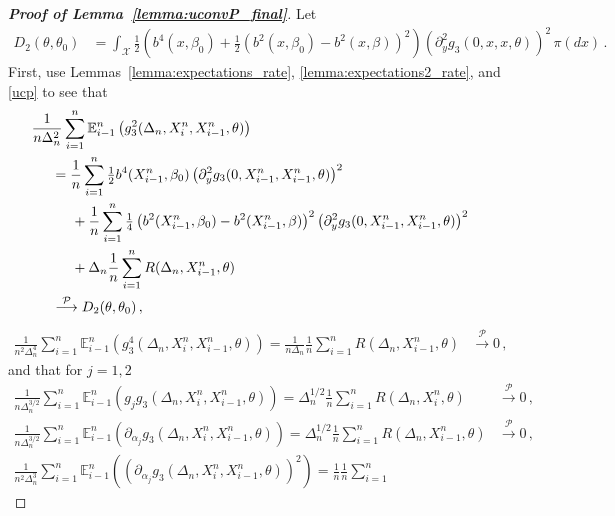 \documentclass[11pt,a4paper]{article}
\newcommand{\xtl}{{X^n_{i-1}}}
\newcommand{\xtr}{X^n_i}
\newcommand{\thetan}{{\theta_0}}
\newcommand{\betan}{{\beta_0}}
\newcommand{\EE}{{\mathbb E}}
\newcommand{\pp}{{\mathcal{P}}}
\newcommand{\xx}{{\mathcal{X}}}
\numberwithin{equation}{section}
\numberwithin{theorem}{section}
\begin{document}
\begin{proof}[\textbf{Proof of Lemma~\ref{lemma:uconvP_final}}]
Let 
\begin{align*}
D_2(\theta, \thetan) &= \int_\xx \tfrac{1}{2}\left( b^4(x, \betan) + \tfrac{1}{2}\left( b^2(x, \betan) - b^2(x,\beta)\right)^2\right)\left(\partial^2_y g_3(0,x,x,\theta)\right)^2\, \pi(dx)\,.
\end{align*}
%
First, use Lemmas~\ref{lemma:expectations_rate}, \ref{lemma:expectations2_rate}, and \ref{ucp} to see that 
\begin{align}
\begin{split}\label{Eg32}
&\hspace{-5mm} \frac{1}{n\Delta_n^2} \sum_{i=1}^n \EE^n_{i-1}\left( g_3^2(\Delta_n,\xtr,\xtl, \theta)\right)\\
&= \frac{1}{n} \sum_{i=1}^n \tfrac{1}{2} b^4(\xtl, \betan)  \left( \partial^2_y g_3(0,\xtl,\xtl, \theta)\right)^2 \\
&\hspace{5mm} +\frac{1}{n} \sum_{i=1}^n \tfrac{1}{4} \left(b^2(\xtl, \betan)-b^2 (\xtl, \beta)\right)^2   \left(\partial^2_y g_3(0,\xtl,\xtl, \theta)\right)^2 \\
&\hspace{5mm} + \Delta_n\frac{1}{n}\sum_{i=1}^n R(\Delta_n,\xtl, \theta)\\
&\overset{\pp}{\longrightarrow} D_2(\theta, \thetan)\,,
\end{split}
\end{align}
\begin{align}
\frac{1}{n^2\Delta_n^4} \sum_{i=1}^n \EE^n_{i-1}\left( g_3^4(\Delta_n,\xtr,\xtl, \theta)\right) = \frac{1}{n\Delta_n}\frac{1}{n} \sum_{i=1}^n R(\Delta_n,\xtl, \theta)
&\overset{\pp}{\longrightarrow} 0\,,\nonumber
\end{align}
%
and that for $j=1,2$
\begin{align}
\label{Egjg3}
\frac{1}{n\Delta_n^{3/2}} \sum_{i=1}^n
\EE^n_{i-1}\left( g_jg_3(\Delta_n,\xtr,\xtl, \theta)\right)
= \Delta_n^{1/2} \frac{1}{n} \sum_{i=1}^n R(\Delta_n, \xtr, \theta)
  &\overset{\pp}{\longrightarrow} 0\,, \\
\frac{1}{n\Delta_n^{3/2}} \sum_{i=1}^n
  \EE^n_{i-1}\left( \partial_{\alpha_j} g_3(\Delta_n,\xtr,\xtl, 
\theta)\right) = \Delta_n^{1/2}\frac{1}{n} \sum_{i=1}^n
R(\Delta_n,\xtl, \theta)
&\overset{\pp}{\longrightarrow} 0\,,\nonumber \\
\frac{1}{n^2\Delta_n^{3}} \sum_{i=1}^n \EE^n_{i-1}\left( \left(
\partial_{\alpha_j} g_3(\Delta_n,\xtr,\xtl,
\theta)\right)^2\right) = \frac{1}{n}\frac{1}{n} \sum_{i=1}^n

\end{align}
\end{proof}
\end{document}
